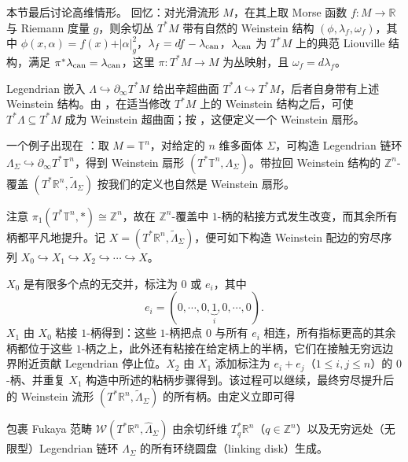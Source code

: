 本节最后讨论高维情形。
回忆：对光滑流形 $M$，在其上取 Morse 函数 $f\colon M\to\mathbb{R}$ 与 Riemann 度量 $g$，则余切丛 $T^{\ast} M$ 带有自然的 Weinstein 结构 $(\phi,\lambda_f,\omega_f)$，其中 $\phi (x,\alpha) =f(x)+\vert\alpha\vert_g^2$，$\lambda_f =df-\lambda_{\operatorname*{\mathrm{can}}}$，$\lambda_{\operatorname*{\mathrm{can}}}$ 为 $T^{\ast} M$ 上的典范 Liouville 结构，满足 $\pi^{\ast}\lambda_{\operatorname*{\mathrm{can}}} =\lambda_{\operatorname*{\mathrm{can}}}$，这里 $\pi\colon T^{\ast} M\to M$ 为丛映射，且 $\omega_f =d\lambda_f$。\par
    Legendrian 嵌入 $\Lambda\hookrightarrow\partial_{\infty} T^{\ast} M$ 给出辛超曲面 $T^{\ast}\Lambda\hookrightarrow T^{\ast} M$，后者自身带有上述 Weinstein 结构。由 \cite{Eliashberg18}，在适当修改 $T^{\ast} M$ 上的 Weinstein 结构之后，可使 $T^{\ast}\Lambda\subseteq T^{\ast} M$ 成为 Weinstein 超曲面；按 \cite{GPS20}，这便定义一个 Weinstein 扇形。\par
    一个例子出现在 \cite{FLTZ12}：取 $M=\mathbb{T}^n$，对给定的 $n$ 维多面体 $\Sigma$，可构造 Legendrian 链环 $\Lambda_{\Sigma}\hookrightarrow\partial_{\infty} T^{\ast}\mathbb{T}^n$，得到 Weinstein 扇形 $(T^{\ast}\mathbb{T}^n,\Lambda_{\Sigma})$。带拉回 Weinstein 结构的 $\mathbb{Z}^n$-覆盖 $(T^{\ast}\mathbb{R}^n,\widetilde{\Lambda}_{\Sigma})$ 按我们的定义也自然是 Weinstein 扇形。\par
    注意 $\pi_1 (T^{\ast}\mathbb{T}^n,\ast)\cong\mathbb{Z}^n$，故在 $\mathbb{Z}^n$-覆盖中 $1$-柄的粘接方式发生改变，而其余所有柄都平凡地提升。记 $X=(T^{\ast}\mathbb{R}^n,\widetilde{\Lambda}_{\Sigma})$，便可如下构造 Weinstein 配边的穷尽序列 $X_0\hookrightarrow X_1\hookrightarrow X_2\hookrightarrow\dotsb\hookrightarrow X$。\par
    $X_0$ 是有限多个点的无交并，标注为 $0$ 或 $e_i$，其中
\[
    e_i =(0,\dotsb ,0,\underbrace{1}_i,0,\dotsb ,0).
\]
$X_1$ 由 $X_0$ 粘接 $1$-柄得到：这些 $1$-柄把点 $0$ 与所有 $e_i$ 相连，所有指标更高的其余柄都位于这些 $1$-柄之上，此外还有粘接在给定柄上的半柄，它们在接触无穷远边界附近贡献 Legendrian 停止位。$X_2$ 由 $X_1$ 添加标注为 $e_i+e_j$（$1\leq i,j\leq n$）的 $0$-柄、并重复 $X_1$ 构造中所述的粘柄步骤得到。该过程可以继续，最终穷尽提升后的 Weinstein 流形 $(T^{\ast}\mathbb{R}^n,\widetilde{\Lambda}_{\Sigma})$ 的所有柄。由定义立即可得
\begin{lmm}\label{lmm:Fukaya-category-Gmn-equivariant-generation}
    包裹 Fukaya 范畴 $\mathcal{W} (T^{\ast}\mathbb{R}^n,\widehat{\Lambda}_{\Sigma})$ 由余切纤维 $T^{\ast}_q\mathbb{R}^n$（$q\in\mathbb{Z}^n$）以及无穷远处（无限型）Legendrian 链环 $\Lambda_{\Sigma}$ 的所有环绕圆盘（linking disk）生成。
\end{lmm}

